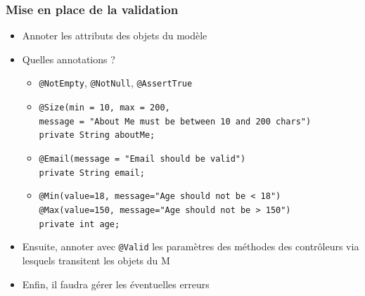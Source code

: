 \documentclass{beamer}
\begin{document}
\begin{frame}
	\frametitle{Mise en place de la validation}
	\begin{itemize}
		\item Annoter les attributs des objets du modèle
		\item Quelles annotations ?
		\begin{itemize}
			\footnotesize
			\item \texttt{@NotEmpty}, \texttt{@NotNull}, \texttt{@AssertTrue}
			\item \texttt{@Size(min = 10, max = 200,\\ message 
				= "About Me must be between 10 and 200 chars")\\
				private String aboutMe;}
			\item \texttt{@Email(message = "Email should be valid")\\
				private String email;}
			\item \texttt{@Min(value=18, message="Age should not be < 18")\\
				@Max(value=150, message="Age should not be > 150")\\
				private int age;}
			\normalsize
		\end{itemize}
		\item Ensuite, annoter avec \texttt{@Valid} les paramètres des méthodes des contrôleurs via lesquels transitent les objets du M
		\item Enfin, il faudra gérer les éventuelles erreurs
		
	\end{itemize}
\end{frame} 
\end{document}
